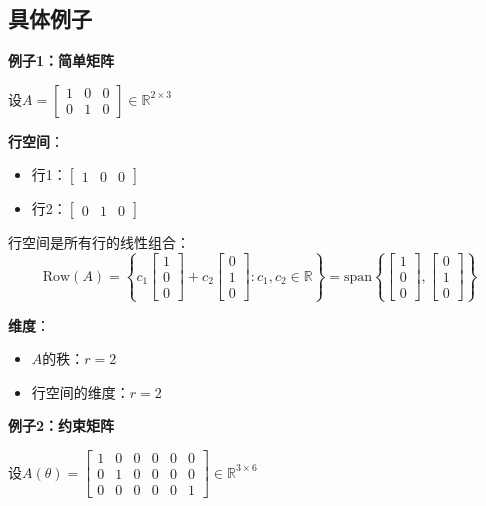 \documentclass[12pt,a4paper]{article}
\begin{document}
\subsection{具体例子}

\textbf{例子1：简单矩阵}

设$A = \begin{bmatrix} 1 & 0 & 0 \\ 0 & 1 & 0 \end{bmatrix} \in \mathbb{R}^{2 \times 3}$

\textbf{行空间}：
\begin{itemize}
\item 行1：$\begin{bmatrix} 1 & 0 & 0 \end{bmatrix}$
\item 行2：$\begin{bmatrix} 0 & 1 & 0 \end{bmatrix}$
\end{itemize}

行空间是所有行的线性组合：
\begin{equation}
\text{Row}(A) = \left\{c_1\begin{bmatrix} 1 \\ 0 \\ 0 \end{bmatrix} + c_2\begin{bmatrix} 0 \\ 1 \\ 0 \end{bmatrix} : c_1, c_2 \in \mathbb{R}\right\} = \text{span}\left\{\begin{bmatrix} 1 \\ 0 \\ 0 \end{bmatrix}, \begin{bmatrix} 0 \\ 1 \\ 0 \end{bmatrix}\right\}
\end{equation}

\textbf{维度}：
\begin{itemize}
\item $A$的秩：$r = 2$
\item 行空间的维度：$r = 2$
\end{itemize}

\textbf{例子2：约束矩阵}

设$A(\theta) = \begin{bmatrix} 1 & 0 & 0 & 0 & 0 & 0 \\ 0 & 1 & 0 & 0 & 0 & 0 \\ 0 & 0 & 0 & 0 & 0 & 1 \end{bmatrix} \in \mathbb{R}^{3 \times 6}$
\end{document}
